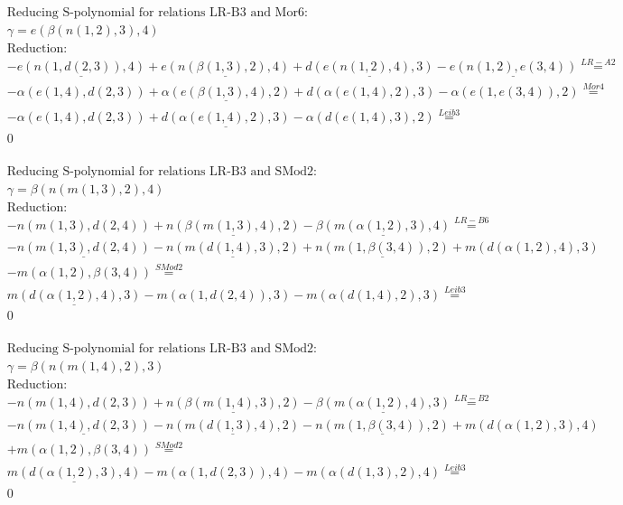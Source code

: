 \documentclass[11pt]{amsart}
\begin{document}
\begin{align*} 
& \text{Reducing S-polynomial for relations LR-B3 and Mor6:} \\ 
& \gamma = e(\beta(n(1,2),3),4) \\ 
& \text{Reduction}: \\& - \underline{e(n(1,d(2,3)),4)} + \underline{e(n(\beta(1,3),2),4)} + \underline{d(e(n(1,2),4),3)} - \underline{e(n(1,2),e(3,4))} \stackrel{ LR-A2 }{=}  \\ 
& - \alpha(e(1,4),d(2,3)) + \underline{\alpha(e(\beta(1,3),4),2)} + d(\alpha(e(1,4),2),3) - \alpha(e(1,e(3,4)),2) \stackrel{ Mor4 }{=}  \\ 
& - \alpha(e(1,4),d(2,3)) + \underline{d(\alpha(e(1,4),2),3)} - \alpha(d(e(1,4),3),2) \stackrel{ Leib3 }{=}  \\ 
&0\\ 
\end{align*} 
 
\begin{align*} 
& \text{Reducing S-polynomial for relations LR-B3 and SMod2:} \\ 
& \gamma = \beta(n(m(1,3),2),4) \\ 
& \text{Reduction}: \\& - n(m(1,3),d(2,4)) + \underline{n(\beta(m(1,3),4),2)} - \underline{\beta(m(\alpha(1,2),3),4)} \stackrel{ LR-B6 }{=}  \\ 
& - \underline{n(m(1,3),d(2,4))} - \underline{n(m(d(1,4),3),2)} + \underline{n(m(1,\beta(3,4)),2)} + m(d(\alpha(1,2),4),3)\\ 
 &  - m(\alpha(1,2),\beta(3,4)) \stackrel{ SMod2 }{=}  \\ 
&\underline{m(d(\alpha(1,2),4),3)} - m(\alpha(1,d(2,4)),3) - m(\alpha(d(1,4),2),3) \stackrel{ Leib3 }{=}  \\ 
&0\\ 
\end{align*} 
 
\begin{align*} 
& \text{Reducing S-polynomial for relations LR-B3 and SMod2:} \\ 
& \gamma = \beta(n(m(1,4),2),3) \\ 
& \text{Reduction}: \\& - n(m(1,4),d(2,3)) + \underline{n(\beta(m(1,4),3),2)} - \underline{\beta(m(\alpha(1,2),4),3)} \stackrel{ LR-B2 }{=}  \\ 
& - \underline{n(m(1,4),d(2,3))} - \underline{n(m(d(1,3),4),2)} - \underline{n(m(1,\beta(3,4)),2)} + m(d(\alpha(1,2),3),4)\\ 
 &  + m(\alpha(1,2),\beta(3,4)) \stackrel{ SMod2 }{=}  \\ 
&\underline{m(d(\alpha(1,2),3),4)} - m(\alpha(1,d(2,3)),4) - m(\alpha(d(1,3),2),4) \stackrel{ Leib3 }{=}  \\ 
&0\\ 
\end{align*} 
 
\end{document}
